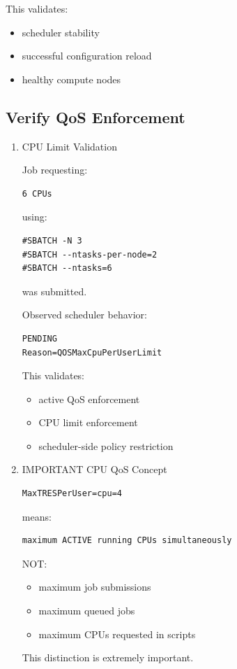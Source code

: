 \documentclass[11pt]{article}
\begin{document}
This validates:

\begin{itemize}
\item scheduler stability
\item successful configuration reload
\item healthy compute nodes
\end{itemize}
\subsection{Verify QoS Enforcement}
\label{sec:orgc503848}

\begin{enumerate}
\item CPU Limit Validation
\label{sec:orgcad1a05}

Job requesting:

\begin{verbatim}
6 CPUs
\end{verbatim}

using:

\begin{verbatim}
#SBATCH -N 3
#SBATCH --ntasks-per-node=2
#SBATCH --ntasks=6
\end{verbatim}

was submitted.

Observed scheduler behavior:

\begin{verbatim}
PENDING
Reason=QOSMaxCpuPerUserLimit
\end{verbatim}

This validates:

\begin{itemize}
\item active QoS enforcement
\item CPU limit enforcement
\item scheduler-side policy restriction
\end{itemize}
\item IMPORTANT CPU QoS Concept
\label{sec:org75291ea}

\begin{verbatim}
MaxTRESPerUser=cpu=4
\end{verbatim}

means:

\begin{verbatim}
maximum ACTIVE running CPUs simultaneously
\end{verbatim}

NOT:

\begin{itemize}
\item maximum job submissions
\item maximum queued jobs
\item maximum CPUs requested in scripts
\end{itemize}

This distinction is extremely important.
\end{enumerate}
\end{document}
